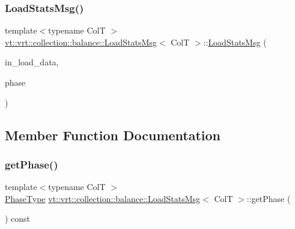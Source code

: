\subsubsection{\texorpdfstring{Load\+Stats\+Msg()}{LoadStatsMsg()}\hspace{0.1cm}{\footnotesize\ttfamily [2/2]}}
{\footnotesize\ttfamily template$<$typename ColT $>$ \\
\hyperlink{structvt_1_1vrt_1_1collection_1_1balance_1_1_load_stats_msg}{vt\+::vrt\+::collection\+::balance\+::\+Load\+Stats\+Msg}$<$ ColT $>$\+::\hyperlink{structvt_1_1vrt_1_1collection_1_1balance_1_1_load_stats_msg}{Load\+Stats\+Msg} (\begin{DoxyParamCaption}\item[{\hyperlink{structvt_1_1vrt_1_1collection_1_1balance_1_1_load_data}{Load\+Data} const \&}]{in\+\_\+load\+\_\+data,  }\item[{\hyperlink{namespacevt_a46ce6733d5cdbd735d561b7b4029f6d7}{Phase\+Type} const \&}]{phase }\end{DoxyParamCaption})\hspace{0.3cm}{\ttfamily [inline]}}



\subsection{Member Function Documentation}
\mbox{\label{structvt_1_1vrt_1_1collection_1_1balance_1_1_load_stats_msg_acfce435d77d32952996e334701fe28ed}} 
\subsubsection{\texorpdfstring{get\+Phase()}{getPhase()}}
{\footnotesize\ttfamily template$<$typename ColT $>$ \\
\hyperlink{namespacevt_a46ce6733d5cdbd735d561b7b4029f6d7}{Phase\+Type} \hyperlink{structvt_1_1vrt_1_1collection_1_1balance_1_1_load_stats_msg}{vt\+::vrt\+::collection\+::balance\+::\+Load\+Stats\+Msg}$<$ ColT $>$\+::get\+Phase (\begin{DoxyParamCaption}{ }\end{DoxyParamCaption}) const\hspace{0.3cm}{\ttfamily [inline]}}



